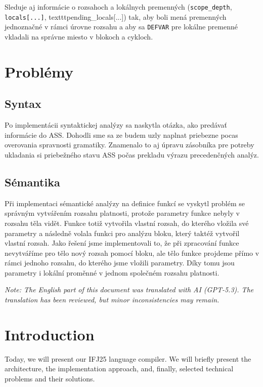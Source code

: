\documentclass{article}
\begin{document}
Sleduje aj informácie o rozsahoch a lokálnych premenných (\texttt{scope\_depth}, \texttt{locals[...]}, texttt{pending\_locals[...]}) tak, aby boli mená premenných jednoznačné v rámci úrovne rozsahu a aby sa \texttt{DEFVAR} pre lokálne premenné vkladali na správne miesto v blokoch a cykloch.

\section{Problémy}
\subsection{Syntax}
Po implementácii syntaktickej analýzy sa naskytla otázka, ako predávať informácie do ASS. Dohodli sme sa ze budem uzly naplnat priebezne pocas overovania spravnosti gramatiky. Znamenalo to aj úpravu zásobníka pre potreby ukladania si priebežného stavu ASS počas prekladu výrazu precedenčných analýz.

\subsection{Sémantika}
Při implementaci sémantické analýzy na definice funkcí se vyskytl problém se správným vytvářením rozsahu platnosti, protože parametry funkce nebyly v rozsahu těla vidět. Funkce totiž vytvořila vlastní rozsah, do kterého vložila své parametry a následně volala funkci pro analýzu bloku, který taktéž vytvořil vlastní rozsah. Jako řešení jsme implementovali to, že při zpracování funkce nevytváříme pro tělo nový rozsah pomocí bloku, ale tělo funkce projdeme přímo v rámci jednoho rozsahu, do kterého jsme vložili parametry. Díky tomu jsou parametry i lokální proměnné v jednom společném rozsahu platnosti.



\clearpage
{}
\label{AI}
\setcounter{section}{0}

\noindent\textit{Note: The English part of this document was translated with AI (GPT-5.3). The translation has been reviewed, but minor inconsistencies may remain.}

\section{Introduction}
Today, we will present our IFJ25 language compiler. We will briefly present the architecture, the implementation approach, and, finally, selected technical problems and their solutions.
\end{document}
